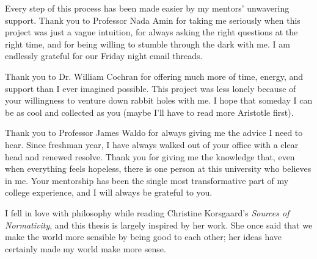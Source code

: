 %
\begin{isabellebody}%
%
%
\isadelimtheory
%
\endisadelimtheory
%
\isatagtheory
%
\endisatagtheory
{\isafoldtheory}%
%
\isadelimtheory
%
\endisadelimtheory
%
\begin{isamarkuptext}%
Every step of this process has been made easier by my mentors' unwavering support. Thank you to Professor 
Nada Amin for taking me seriously when this project was just a vague intuition, for always asking the 
right questions at the right time, and for being willing 
to stumble through the dark with me. I am endlessly grateful for our Friday night email threads.

Thank you to Dr. William Cochran for offering much more of time, energy, and support than I ever 
imagined possible. This project was less lonely because of your
willingness to venture down rabbit holes with me. I hope that someday I can be as cool and 
collected as you (maybe I'll have to read more Aristotle first).

Thank you to Professor James Waldo for always giving me the advice I need to hear. Since freshman year, 
I have always walked out of your office with a clear head and renewed resolve. Thank you for giving me the 
knowledge that, even when everything feels hopeless, there is one person at this university who believes in me.
Your mentorship has been the single most transformative part of my college experience, and I will always
be grateful to you.

I fell in love with philosophy while reading Christine Korsgaard's \emph{Sources of Normativity}, and 
this thesis is largely inspired by her work. She once said that 
we make the world more sensible by being good to each other; her ideas have certainly made my world make more
sense.%
\end{isamarkuptext}\isamarkuptrue%
%
\isadelimtheory
%
\endisadelimtheory
%
\isatagtheory
%
\endisatagtheory
{\isafoldtheory}%
%
\isadelimtheory
%
\endisadelimtheory
%
\end{isabellebody}%
\endinput
